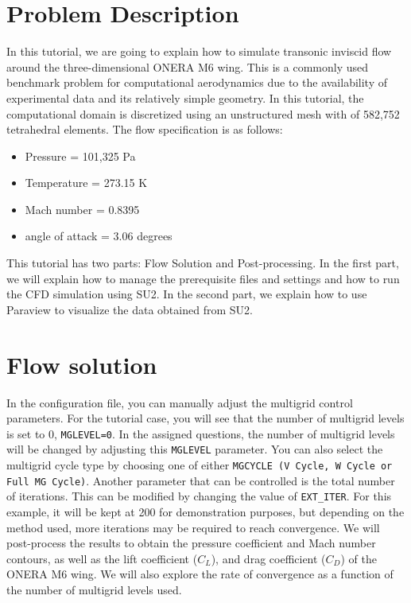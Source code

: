 \section{Problem Description}
In this tutorial, we are going to explain how to simulate transonic inviscid flow around the three-dimensional ONERA M6 wing. This is a commonly used benchmark problem for computational aerodynamics due to the availability of experimental data and its relatively simple geometry. In this tutorial, the computational domain is discretized using an unstructured mesh with of 582,752 tetrahedral elements. The flow specification is as follows:
\begin{itemize}
    \item Pressure = 101,325 Pa
    \item Temperature = 273.15 K
    \item Mach number = 0.8395
    \item angle of attack = 3.06 degrees
\end{itemize}

This tutorial has two parts: Flow Solution and Post-processing. In the first part, we will explain how to manage the prerequisite files and settings and how to run the CFD simulation using SU2. In the second part, we explain how to use Paraview to visualize the data obtained from SU2.
\section{Flow solution}
In the configuration file, you can manually adjust the multigrid control parameters. For the tutorial case, you will see that the number of multigrid levels is set to 0, \texttt{MGLEVEL=0}. In the assigned questions, the number of multigrid levels will be changed by adjusting this \texttt{MGLEVEL} parameter. You can also select the multigrid cycle type by choosing one of either \texttt{MGCYCLE (V Cycle, W Cycle or Full MG Cycle)}. Another parameter that can be controlled is the total number of iterations. This can be modified by changing the value of \texttt{EXT\_ITER}. For this example, it will be kept at 200 for demonstration purposes, but depending on the method used, more iterations may be required to reach convergence. We will post-process the results to obtain the pressure coefficient and Mach number contours, as well as the lift coefficient ($C_L$), and drag coefficient ($C_D$) of the ONERA M6 wing. We will also explore the rate of convergence as a function of the number of multigrid levels used.

